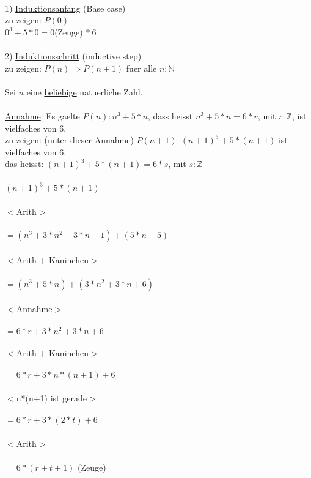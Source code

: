\documentclass[18pt,a4paper]{article}
\newcommand{\tab}{\hspace*{2em}}
\begin{document}
\\
1) \uline{Induktionsanfang} (Base case)\\
zu zeigen: $P(0)$\\
$0^3 + 5*0 = 0$(Zeuge) $*\:6$\\
\\
2) \uline{Induktionsschritt} (inductive step)\\
zu zeigen: $P(n) \Rightarrow P(n+1)$ fuer alle $n:\mathbb{N}$\\
\\
Sei $n$ eine \uline{beliebige} natuerliche Zahl.\\
\\
\uline{Annahme}: Es gaelte $P(n) : n^3 + 5 * n$, dass heisst $n^3 + 5 * n = 6 * r$, mit $r : \mathbb{Z}$, ist vielfaches von $6$.\\
zu zeigen: (unter dieser Annahme) $P(n+1): (n+1)^3 + 5 * (n+1)$ ist vielfaches von $6$.\\
das heisst: $(n+1)^3 + 5 * (n+1) = 6 * s$, mit $s: \mathbb{Z}$\\
\\
$(n+1)^3 + 5 * (n+1)$\\
\\
\tab $<$Arith$>$ \\
\\
$= (n^3 + 3*n^2 + 3*n +1) + (5*n + 5)$\\
\\
\tab $<$Arith + Kaninchen$>$ \\
\\
$= (n^3 + 5*n) + (3*n^2 + 3*n + 6)$\\
\\
\tab $<$Annahme$>$\\
\\
$= 6*r + 3*n^2 + 3*n + 6$\\
\\
\tab $<$Arith + Kaninchen$>$\\
\\
$= 6*r + 3*n*(n+1) + 6$\\
\\
\tab $<$n*(n+1) ist gerade$>$\\
\\
$= 6*r + 3*(2*t) + 6$\\
\\
\tab $<$Arith$>$\\
\\
$= 6*(r+t+1)$ (Zeuge) \checkmark \\
\\
\\
\end{document}
